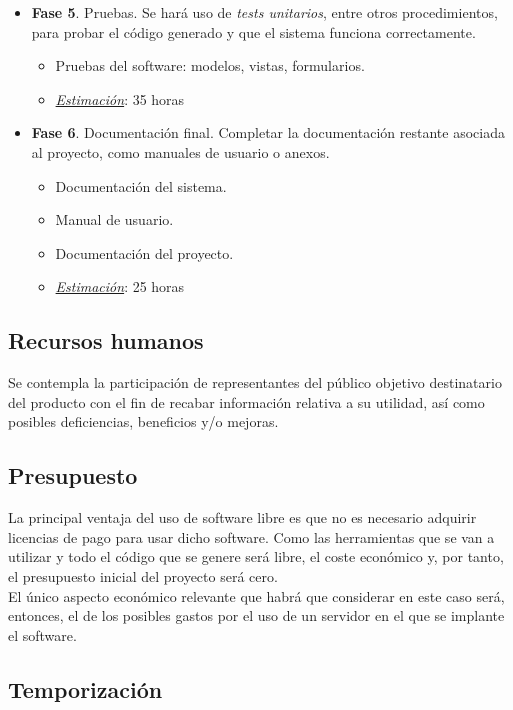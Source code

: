 \begin{itemize}
	\item \textbf{Fase 5}. Pruebas. Se hará uso de \textit{tests unitarios}, entre otros procedimientos, para probar el código generado y que el sistema funciona correctamente.
	\begin{itemize}
		\item Pruebas del software: modelos, vistas, formularios.
		\item \underline{\textit{Estimación}}: 35 horas
	\end{itemize}
	
	\item \textbf{Fase 6}. Documentación final. Completar la documentación restante asociada al proyecto, como manuales de usuario o anexos.
	\begin{itemize}
		\item Documentación del sistema.
		\item Manual de usuario.
		\item Documentación del proyecto.
		\item \underline{\textit{Estimación}}: 25 horas
	\end{itemize}
\end{itemize}

\subsection{Recursos humanos}

Se contempla la participación de representantes del público objetivo destinatario del producto con el fin de recabar información relativa a su utilidad, así como posibles deficiencias, beneficios y/o mejoras.

\subsection{Presupuesto}

La principal ventaja del uso de software libre es que no es necesario adquirir licencias de pago para usar dicho software. Como las herramientas que se van a utilizar y todo el código que se genere será libre, el coste económico y, por tanto, el presupuesto inicial del proyecto será cero.\\

El único aspecto económico relevante que habrá que considerar en este caso será, entonces, el de los posibles gastos por el uso de un servidor en el que se implante el software.

\subsection*{Temporización}

